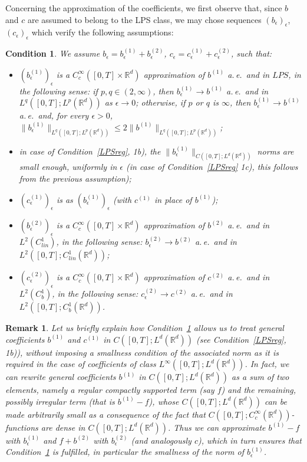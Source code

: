 \documentclass[a4paper,10pt]{article}
\newtheorem{condition}[theorem]{Condition}
\newtheorem{remark}[theorem]{Remark}
\newcommand{\mr}{\mathbb{R}}
\newcommand{\eps}{\epsilon}
\begin{document}
Concerning the approximation of the coefficients, we first observe that, since $b$ and $c$ are assumed to belong to the LPS class, we may chose sequences $(b_\eps)_\eps$, $(c_\eps)_\eps$ which verify the following assumptions:

\begin{condition}\label{LPSappprox}
We assume $b_\eps=b^{(1)}_\eps+b^{(2)}_\eps$, $c_\eps=c^{(1)}_\eps+c^{(2)}_\eps$, such that:
\begin{itemize}
\item $(b^{(1)}_\eps)_\eps$ is a $C^\infty_c([0,T]\times\mr^d)$ approximation of $b^{(1)}$ a.\,e.\ and in $LPS$, in the following sense: if $p,q \in (2,\infty)$, then $b^{(1)}_\eps\rightarrow b^{(1)}$ a.\,e.\ and in $L^q([0,T];L^p(\mr^d))$ as $\eps\rightarrow0$; otherwise, if $p$ or $q$ is $\infty$, then $b^{(1)}_\eps\rightarrow b^{(1)}$ a.\,e.\ and, for every $\eps>0$, $\|b^{(1)}_\eps\|_{L^q([0,T];L^p(\mr^d))}\le 2\|b^{(1)}\|_{L^q([0,T];L^p(\mr^d))}$;
\item in case of Condition~\ref{LPSreg}, 1b), the $\|b^{(1)}_\eps\|_{C([0,T];L^d(\mr^d))}$ norms are small enough, uniformly in $\eps$ (in case of Condition~\ref{LPSreg} 1c), this follows from the previous assumption);
\item $(c^{(1)}_\eps)_\eps$ is as $(b^{(1)}_\eps)_\eps$ (with $c^{(1)}$ in place of $b^{(1)}$);
\item $(b^{(2)}_\eps)_\eps$ is a $C^\infty_c([0,T]\times\mr^d)$ approximation of $b^{(2)}$ a.\,e.\ and in $L^2(C^1_{lin})$, in the following sense: $b^{(2)}_\eps\rightarrow b^{(2)}$ a.\,e.\ and in $L^2([0,T];C^1_{lin}(\mr^d))$;
\item $(c^{(2)}_\eps)_\eps$ is a $C^\infty_c([0,T]\times\mr^d)$ approximation of $c^{(2)}$ a.\,e.\ and in $L^2(C^1_b)$, in the following sense: $c^{(2)}_\eps\rightarrow c^{(2)}$ a.\,e.\ and in $L^2([0,T];C^1_b(\mr^d))$.
\end{itemize}
\end{condition}

\begin{remark}
Let us briefly explain how Condition~\ref{LPSappprox} allows us to treat general coefficients $b^{(1)}$ and $c^{(1)}$ in $C([0,T];L^d(\mr^d))$ (see Condition~\ref{LPSreg}, 1b)), without imposing a smallness condition of the associated norm as it is required in the case of coefficients of class $L^\infty([0,T];L^d(\mr^d))$. In fact, we can rewrite general coefficients $b^{(1)}$ in $C([0,T];L^d(\mr^d))$ as a sum of two elements, namely a regular compactly supported term (say $f$) and the remaining, possibly irregular term (that is $b^{(1)} - f$), whose $C([0,T];L^d(\mr^d))$ can be made arbitrarily small as a consequence of the fact that $C([0,T];C^\infty_c(\mr^d))$-functions are dense in $C([0,T];L^d(\mr^d))$. Thus we can approximate $b^{(1)} - f$ with $b^{(1)}_\eps$ and $f+b^{(2)}$ with $b^{(2)}_\eps$ (and analogously $c$), which in turn ensures that Condition~\ref{LPSappprox} is fulfilled, in particular the smallness of the norm of $b^{(1)}_\eps$.
\end{remark}
\end{document}

